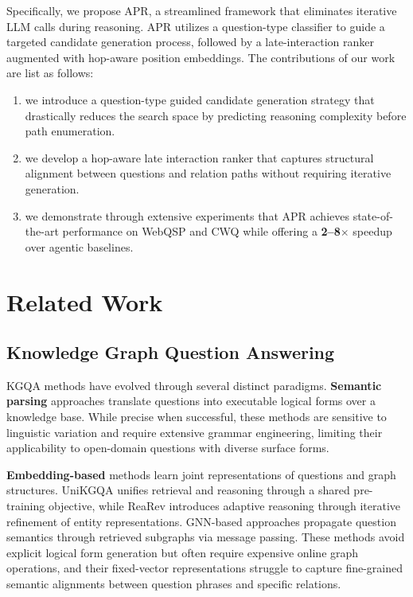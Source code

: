 \documentclass[conference]{IEEEtran}
\newcommand{\model}{\textsc{APR}}
\begin{document}


Specifically, we propose \model{}, a streamlined framework that eliminates iterative LLM calls during reasoning. \model{} utilizes a question-type classifier to guide a targeted candidate generation process, followed by a late-interaction ranker augmented with hop-aware position embeddings. The contributions of our work are list as follows:
\begin{enumerate}
    \item we introduce a question-type guided candidate generation strategy that drastically reduces the search space by predicting reasoning complexity before path enumeration. 
    \item we develop a hop-aware late interaction ranker that captures structural alignment between questions and relation paths without requiring iterative generation. \item we demonstrate through extensive experiments that \model{} achieves state-of-the-art performance on WebQSP and CWQ while offering a \textbf{2--8$\times$} speedup over agentic baselines.
\end{enumerate}




\section{Related Work}

\subsection{Knowledge Graph Question Answering}

KGQA methods have evolved through several distinct paradigms. \textbf{Semantic parsing} approaches \cite{yih2016webqsp, yu2018spider, lei2024spider2} translate questions into executable logical forms over a knowledge base. While precise when successful, these methods are sensitive to linguistic variation and require extensive grammar engineering, limiting their applicability to open-domain questions with diverse surface forms.

\textbf{Embedding-based} methods learn joint representations of questions and graph structures. UniKGQA \cite{jiang2023unikgqa} unifies retrieval and reasoning through a shared pre-training objective, while ReaRev \cite{luo2022rearev} introduces adaptive reasoning through iterative refinement of entity representations. GNN-based approaches \cite{yasunaga2021qagnn} propagate question semantics through retrieved subgraphs via message passing. These methods avoid explicit logical form generation but often require expensive online graph operations, and their fixed-vector representations struggle to capture fine-grained semantic alignments between question phrases and specific relations.
\end{document}
